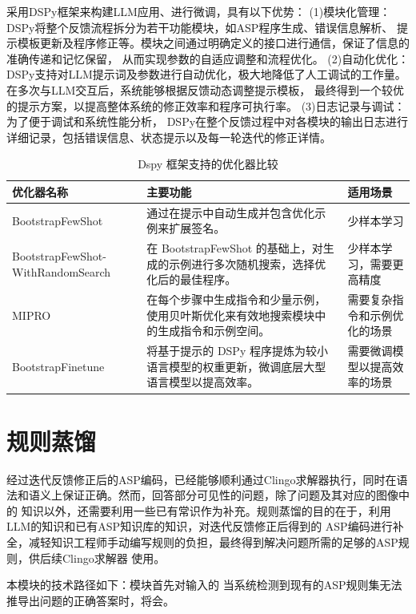 采用DSPy框架来构建LLM应用、进行微调，具有以下优势：
(1)模块化管理：DSPy将整个反馈流程拆分为若干功能模块，如ASP程序生成、错误信息解析、
提示模板更新及程序修正等。模块之间通过明确定义的接口进行通信，保证了信息的准确传递和记忆保留，
从而实现参数的自适应调整和流程优化。
(2)自动化优化：DSPy支持对LLM提示词及参数进行自动优化，极大地降低了人工调试的工作量。
在多次与LLM交互后，系统能够根据反馈动态调整提示模板，
最终得到一个较优的提示方案，以提高整体系统的修正效率和程序可执行率。
(3)日志记录与调试：为了便于调试和系统性能分析，
DSPy在整个反馈过程中对各模块的输出日志进行详细记录，包括错误信息、状态提示以及每一轮迭代的修正详情。
\begin{table}[htbp]
\centering
\caption{Dspy 框架支持的优化器比较}
\label{tab:optimizer_comparison}
\begin{tabular}{|>{\raggedright}p{4cm}|>{\raggedright}p{8cm}|>{\raggedright\arraybackslash}p{4cm}|}
\hline
\textbf{优化器名称} & \textbf{主要功能} & \textbf{适用场景} \\
\hline
BootstrapFewShot & 通过在提示中自动生成并包含优化示例来扩展签名。 & 少样本学习 \\
\hline
BootstrapFewShot-
WithRandomSearch & 在 BootstrapFewShot 的基础上，对生成的示例进行多次随机搜索，选择优化后的最佳程序。 & 少样本学习，需要更高精度 \\
\hline
MIPRO & 在每个步骤中生成指令和少量示例，使用贝叶斯优化来有效地搜索模块中的生成指令和示例空间。 & 需要复杂指令和示例优化的场景 \\
\hline
BootstrapFinetune & 将基于提示的 DSPy 程序提炼为较小语言模型的权重更新，微调底层大型语言模型以提高效率。 & 需要微调模型以提高效率的场景 \\
\hline
\end{tabular}
\end{table}
\section{规则蒸馏}
经过迭代反馈修正后的ASP编码，已经能够顺利通过Clingo求解器执行，同时在语法和语义上保证正确。然而，回答部分可见性的问题，除了问题及其对应的图像中的
知识以外，还需要利用一些已有常识作为补充。规则蒸馏的目的在于，利用LLM的知识和已有ASP知识库的知识，对迭代反馈修正后得到的
ASP编码进行补全，减轻知识工程师手动编写规则的负担，最终得到解决问题所需的足够的ASP规则，供后续Clingo求解器
使用。

本模块的技术路径如下：模块首先对输入的
当系统检测到现有的ASP规则集无法推导出问题的正确答案时，将会。
